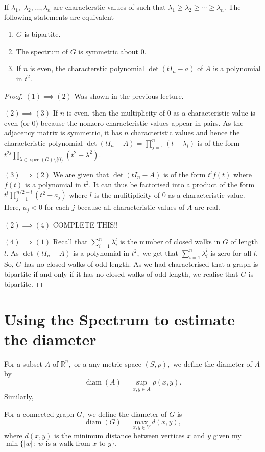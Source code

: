 
\begin{theorem}
	If $ \lambda_1,$ $ \lambda_2, \dotsc, \lambda_n$ are characterstic
	values of  
	such that $ \lambda_1 \geq \lambda_2 \geq \cdots \geq \lambda_n.$
	The following statements are equivalent
	
	\begin{enumerate}
		\item $G$ is bipartite.
		\item The spectrum of $G$ is symmetric about $0.$
		\item If $n$ is even, the characterstic polynomial $\det(t I_n - a)$ of $A$ is a polynomial in $t^2.$
	\end{enumerate}
\end{theorem}

\begin{proof}
	$(1) \implies (2)$ Was shown in the previous lecture.	

	$(2) \implies (3)$ If $n$ is even, then the multiplicity of $0$
	as a characteristic value is even (or $0$) because the nonzero
	characteristic values appear in pairs. As the adjacency matrix
	is symmetric, it has $n$ characteristic values and hence the
	characteristic polynomial $\det(t I_n - A) = \prod_{j=1}^{n} (t - \lambda_i)$
	is of the form $t^{2j} \prod_{ \lambda \in \operatorname{spec}(G) \setminus\{0\} } (t^2 - \lambda^2) .$

	$(3) \implies (2)$  We are given that
	$\det(t I_n - A)$ is of the form $t^l f(t)$ where
	$f(t)$ is a polynomial in $t^2.$ It can thus be 
	factorised into a product of the form 
	$ t^l \prod_{j=1}^{n/2 - l} (t^2 - a_j)$
	where $l$ is the mulitiplicity of $0$ as a characteristic value.
	Here, $a_j <0$ for each $j$ because all characteristic values
	of $A$ are real.

	$(2) \implies (4)$
	COMPLETE THIS!!

	$(4) \implies (1)$ 
	Recall that $\sum_{i=1}^{n} \lambda_i^l$ is the number of closed
	walks in $G$ of length $l.$ As $\det(t I_n - A)$ is a polynomial
	in $t^2,$ we get that $\sum_{i=1}^{n} \lambda_i^l$ is zero for
	all $l.$ So, $G$ has no closed walks of odd length. As we had 
	characterised that a graph is bipartite if and only if it has no
	closed walks of odd length, we realise that $G$ is bipartite.
\end{proof}

\section{Using the Spectrum to estimate the diameter}
For a subset $A$ of $\mathbb{R}^n,$ or a any metric space $(S,\rho),$
we define the diameter of $A$ by
$$ \operatorname{diam}(A) = \sup_{x,y \in A} \rho(x,y). $$
Similarly,
\begin{definition}
	For a connected graph $G,$ we define the diameter of $G$ is 
	$$\operatorname{diam}(G) = \max_{x,y \in V} d(x,y),$$
	where $d(x,y)$ is the minimum distance between vertices $x$ and
	$y$ given my $\min\{ \lvert w \rvert \, : \, w \text{ is a walk
	from } x \text{ to } y \}.$
\end{definition}

